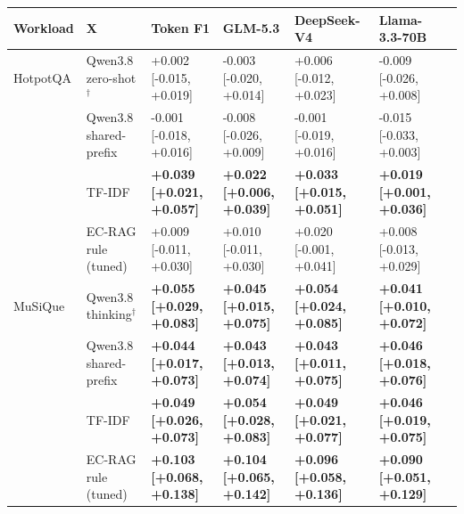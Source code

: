 \begin{tabular}{@{}lllllll@{}}
\toprule
Workload & X & Token F1 & GLM-5.3 & DeepSeek-V4 & Llama-3.3-70B\\
\midrule
HotpotQA & Qwen3.8 zero-shot$^\dagger$ & +0.002 [-0.015, +0.019] & -0.003 [-0.020, +0.014] & +0.006 [-0.012, +0.023] & -0.009 [-0.026, +0.008]\\
 & Qwen3.8 shared-prefix & -0.001 [-0.018, +0.016] & -0.008 [-0.026, +0.009] & -0.001 [-0.019, +0.016] & -0.015 [-0.033, +0.003]\\
 & TF-IDF & \textbf{+0.039 [+0.021, +0.057]} & \textbf{+0.022 [+0.006, +0.039]} & \textbf{+0.033 [+0.015, +0.051]} & \textbf{+0.019 [+0.001, +0.036]}\\
 & EC-RAG rule (tuned) & +0.009 [-0.011, +0.030] & +0.010 [-0.011, +0.030] & +0.020 [-0.001, +0.041] & +0.008 [-0.013, +0.029]\\
\midrule
MuSiQue & Qwen3.8 thinking$^\dagger$ & \textbf{+0.055 [+0.029, +0.083]} & \textbf{+0.045 [+0.015, +0.075]} & \textbf{+0.054 [+0.024, +0.085]} & \textbf{+0.041 [+0.010, +0.072]}\\
 & Qwen3.8 shared-prefix & \textbf{+0.044 [+0.017, +0.073]} & \textbf{+0.043 [+0.013, +0.074]} & \textbf{+0.043 [+0.011, +0.075]} & \textbf{+0.046 [+0.018, +0.076]}\\
 & TF-IDF & \textbf{+0.049 [+0.026, +0.073]} & \textbf{+0.054 [+0.028, +0.083]} & \textbf{+0.049 [+0.021, +0.077]} & \textbf{+0.046 [+0.019, +0.075]}\\
 & EC-RAG rule (tuned) & \textbf{+0.103 [+0.068, +0.138]} & \textbf{+0.104 [+0.065, +0.142]} & \textbf{+0.096 [+0.058, +0.136]} & \textbf{+0.090 [+0.051, +0.129]}\\
\bottomrule
\end{tabular}
